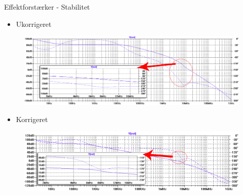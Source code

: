\begin{frame}{Effektforstærker - Stabilitet}

\begin{itemize}
\item Ukorrigeret
\end{itemize}
\begin{figure}[h]
\centering
\includegraphics[width=\textwidth]{images/stabilitet-udenc-graf.png}
\end{figure}

\begin{itemize}
\item Korrigeret
\end{itemize}
\begin{figure}[h]
\centering
\includegraphics[width=\textwidth]{images/stabilitet-medc-graf.png}
\end{figure}

\end{frame}


